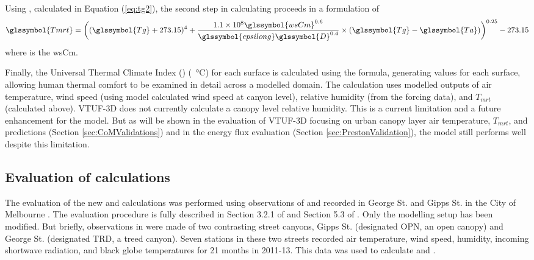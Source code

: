 \documentclass[final,3p,times,authoryear]{elsarticle}
\begin{document}
Using , calculated in Equation (\ref{eq:tg2}), the second step in calculating  proceeds in a formulation of \cite{Kantor2011} 
\begin{equation}\label{eq:tmrtbucket}
  \glssymbol{Tmrt} = 
  \bigg(
   (\glssymbol{Tg}+273.15)^{4} + 
    \frac{1.1 \times 10^{8}  \glssymbol{wsCm}^{0.6}}{\glssymbol{epsilong}  \glssymbol{D}^{0.4}}
    \times 
     (\glssymbol{Tg}-\glssymbol{Ta})
    \bigg)^{0.25} - 273.15
\end{equation}
 where  is the \glsdesc{wsCm}.



Finally, the Universal Thermal Climate Index () (\SI{}{\degreeCelsius}) for each surface is calculated using the \cite{Brode2009u}  formula, generating  values for each surface, allowing human thermal comfort to be examined in detail across a modelled domain. The calculation uses modelled outputs of air temperature, wind speed (using model calculated wind speed at canyon level), relative humidity (from the forcing data), and $T_{mrt}$ (calculated above). VTUF-3D does not currently calculate a canopy level relative humidity. This is a current limitation and a future enhancement for the model. But as will be shown in the evaluation of VTUF-3D focusing on urban canopy layer air temperature, $T_{mrt}$, and  predictions (Section \ref{sec:CoMValidations}) and in the energy flux evaluation (Section \ref{sec:PrestonValidation}), the model still performs well despite this limitation. 




\subsection{Evaluation of  calculations}\label{sec:methods_eval}

The evaluation of the new  and  calculations was performed using observations of  and  recorded in George St. and Gipps St. in the City of Melbourne \citep{Coutts2015}. The evaluation procedure is fully described in Section 3.2.1 of \cite{Nice2018} and Section 5.3 of \cite{Nice2016}. Only the modelling setup has been modified. But briefly, observations in \cite{Coutts2015} were made of two contrasting street canyons, Gipps St. (designated OPN, an open canopy) and George St. (designated TRD, a treed canyon). Seven stations in these two streets recorded air temperature, wind speed, humidity, incoming shortwave radiation, and black globe temperatures for 21 months in 2011-13. This data was used to calculate  and . 
\end{document}
